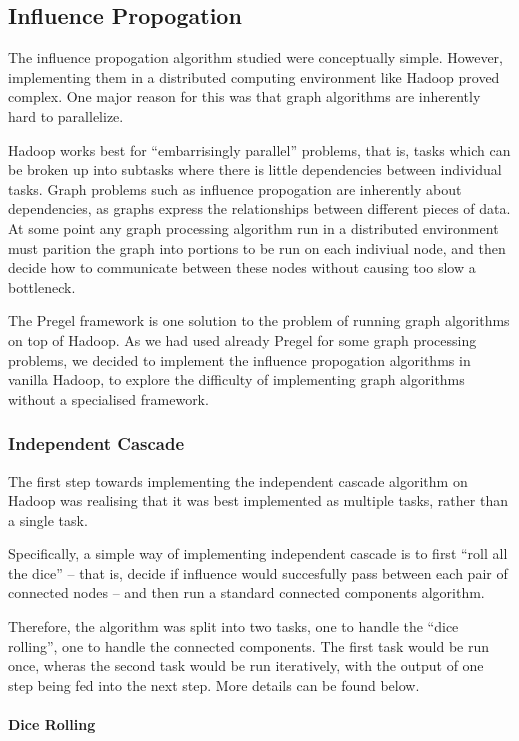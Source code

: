 \subsection{Influence Propogation}

The influence propogation algorithm studied were conceptually simple. However, implementing them in a distributed computing environment like Hadoop proved complex. One major reason for this was that graph algorithms are inherently hard to parallelize. 

Hadoop works best for ``embarrisingly parallel'' problems, that is, tasks which can be broken up into subtasks where there is little dependencies between individual tasks. Graph problems such as influence propogation are inherently about dependencies, as graphs express the relationships between different pieces of data. At some point any graph processing algorithm run in a distributed environment must parition the graph into portions to be run on each indiviual node, and then decide how to communicate between these nodes without causing too slow a bottleneck.

The Pregel framework is one solution to the problem of running graph algorithms on top of Hadoop. As we had used already Pregel for some graph processing problems, we decided to implement the influence propogation algorithms in vanilla Hadoop, to explore the difficulty of implementing graph algorithms without a specialised framework.

\subsubsection{Independent Cascade}

The first step towards implementing the independent cascade algorithm on Hadoop was realising that it was best implemented as multiple tasks, rather than a single task.

Specifically, a simple way of implementing independent cascade is to first ``roll all the dice'' -- that is, decide if influence would succesfully pass between each pair of connected nodes -- and then run a standard connected components algorithm.

Therefore, the algorithm was split into two tasks, one to handle the ``dice rolling'', one to handle the connected components. The first task would be run once, wheras the second task would be run iteratively, with the output of one step being fed into the next step. More details can be found below.

\paragraph{Dice Rolling}

